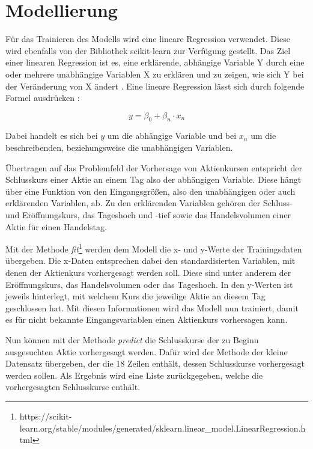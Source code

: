 \chapter{Modellierung}\label{chp:modellierung}
Für das Trainieren des Modells wird eine lineare Regression verwendet. Diese wird ebenfalls von der Bibliothek scikit-learn zur Verfügung gestellt. Das Ziel einer linearen Regression ist es, eine erklärende, abhängige Variable Y durch eine oder mehrere unabhängige Variablen X zu erklären und zu zeigen, wie sich Y bei der Veränderung von X ändert \parencite[vgl.][S. 2]{.2010}. Eine lineare Regression lässt sich durch folgende Formel ausdrücken \parencite[vgl.][S. 1]{Montgomery.2021}:

\begin{equation*}
    y = \beta_0 + \beta_n \cdot x_n
\end{equation*}

Dabei handelt es sich bei $y$ um die abhängige Variable und bei $x_n$ um die beschreibenden, beziehungsweise die unabhängigen Variablen.

Übertragen auf das Problemfeld der Vorhersage von Aktienkursen entspricht der Schlusskurs einer Aktie an einem Tag also der abhängigen Variable. Diese hängt über eine Funktion von den Eingangsgrößen, also den unabhängigen oder auch erklärenden Variablen, ab. Zu den erklärenden Variablen gehören der Schluss- und Eröffnungskurs, das Tageshoch und -tief sowie das Handelsvolumen einer Aktie für einen Handelstag.


Mit der Methode \textit{fit}\footnote{https://scikit-learn.org/stable/modules/generated/sklearn.linear\_model.LinearRegression.html} werden dem Modell die x- und y-Werte der Trainingsdaten übergeben. Die x-Daten entsprechen dabei den standardisierten Variablen, mit denen der Aktienkurs vorhergesagt werden soll. Diese sind unter anderem der Eröffnungskurs, das Handelsvolumen oder das Tageshoch. In den y-Werten ist jeweils hinterlegt, mit welchem Kurs die jeweilige Aktie an diesem Tag geschlossen hat. Mit diesen Informationen wird das Modell nun trainiert, damit es für nicht bekannte Eingangsvariablen einen Aktienkurs vorhersagen kann.

Nun können mit der Methode \textit{predict} die Schlusskurse der zu Beginn ausgesuchten Aktie vorhergesagt werden. Dafür wird der Methode der kleine Datensatz übergeben, der die 18 Zeilen enthält, dessen Schlusskurse vorhergesagt werden sollen. Als Ergebnis wird eine Liste zurückgegeben, welche die vorhergesagten Schlusskurse enthält. 